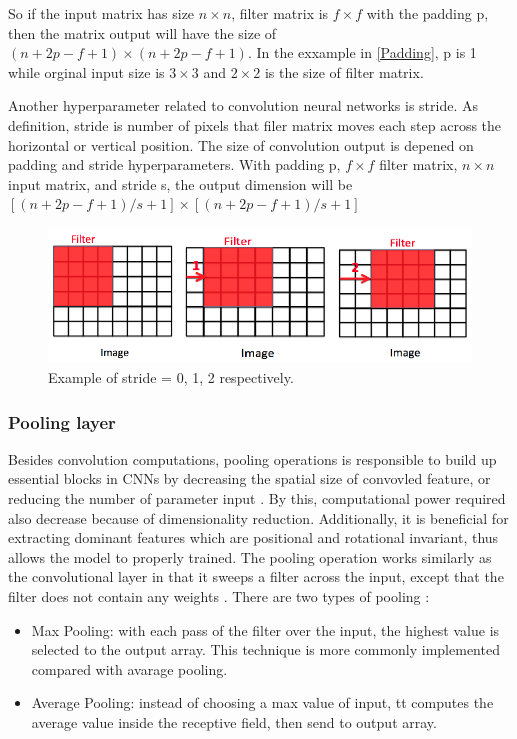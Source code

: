 \documentclass[a4paper, 12pt]{article}
\begin{document}
So if the input matrix has size $n \times n$, filter matrix is $f \times f$ with the padding p, then the matrix output will have the size of $(n + 2p - f + 1) \times (n + 2p -f + 1)$. In the exxample in \ref{Padding}, p is 1 while orginal input size is $3 \times 3$ and $2 \times 2$ is the size of filter matrix.

Another hyperparameter related to convolution neural networks is stride. As definition, stride is number of pixels that filer matrix moves each step across the horizontal or vertical  position. The size of convolution output is depened on padding and stride hyperparameters. With padding p, $f \times f$ filter matrix, $n \times n$ input matrix, and stride s, the output dimension will be $[{(n + 2p - f + 1) / s } + 1] \times [{(n + 2p - f + 1) / s } + 1]$

\begin{figure}[H]
    \centering
    \includegraphics[width=\textwidth]{stride.png}
    \caption{Example of stride = 0, 1, 2 respectively.}
\end{figure}

\subsubsection{Pooling layer}
Besides convolution computations, pooling operations is responsible to build up essential blocks in CNNs by decreasing the spatial size of convovled feature, or reducing the number of parameter input \citep{dumoulin2016guide}. By this, computational power required also decrease because of dimensionality reduction. Additionally, it is beneficial for extracting dominant features which are positional and rotational invariant, thus allows the model to properly trained. The pooling operation works similarly as the convolutional layer in that it sweeps a filter across the input, except that the filter does not contain any weights \citep{albawi2017understanding}. There are two types of pooling \citep{ibmConvNet}:

\begin{itemize}
    \item Max Pooling: with each pass of the filter over the input, the highest value is selected to the output array. This technique is more commonly implemented compared with avarage pooling.
    \item Average Pooling: instead of choosing a max value of input, tt computes the average value inside the receptive field, then send to output array.
\end{itemize}
\end{document}
